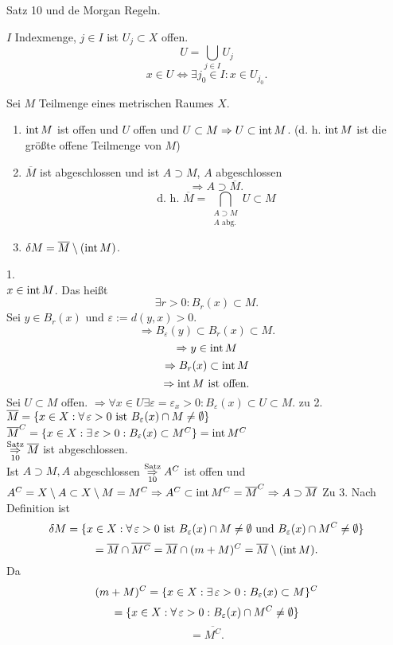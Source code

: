 \documentclass[../ana2.tex]{subfiles}
\begin{document}
\begin{bew}
    Satz 10 und de Morgan Regeln.
\end{bew}
\begin{bem}
    \( I \) Indexmenge, \( j \in I \) ist 
    \( U_j \subset X \) offen.
    \[ U = \bigcup_{j\in I} U_j \]
    \[ x \in U \Leftrightarrow \exists j_0 \in I: 
    x \in U_{j_0}. \]
\end{bem}
\begin{satz}
    Sei \( M \) Teilmenge eines metrischen 
    Raumes \( X \).
    \begin{enumerate}
        \item \( \operatorname{int} M \) ist offen und \( U \) offen 
        und \( U \subset M \Rightarrow U \subset \operatorname{int} M \).
        (d. h. \( \operatorname{int} M \) ist die größte offene Teilmenge 
        von \(M\))
        \item \( \overline{M} \) ist abgeschlossen und ist 
        \(A \supset M \), \( A \) abgeschlossen 
        \[ \Rightarrow A \supset \overline{M}. \]
        \[ \text{d. h. } \overline{M} 
        = \bigcap_{\substack{A \supset M\\A \text{ abg.}}} 
        U \subset M \]
        \item \( \delta M = \overline{M} \setminus (\operatorname{int} M) \).
    \end{enumerate}
\end{satz}
\begin{bew}
    1.\\
    \( x \in \operatorname{int} M \). Das heißt 
    \[ \exists r > 0: B_r(x) \subset M. \]
    Sei \( y \in B_r(x) \) und \( \varepsilon := d(y,x) > 0 \).
    \[ \Rightarrow B_\varepsilon(y) \subset B_r(x) 
    \subset M. \]
    \[ \Rightarrow y \in \operatorname{int} M \]
    \[ \Rightarrow B_r(x) \subset \operatorname{int} M \]
    \[ \Rightarrow \operatorname{int} M \text{ ist offen}. \]
    Sei \( U \subset M \) offen. 
    \( \Rightarrow \forall x \in U 
    \exists \varepsilon = \varepsilon_x > 0: 
    B_\varepsilon(x) \subset U \subset M \).
    zu 2. \( \overline{M} = \set{x \in X: \forall \varepsilon > 0 
    \text{ ist } B_\varepsilon(x) \cap M \neq \emptyset} \) \\
    \( \overline{M}^C = \set{x \in X: \exists \varepsilon > 0: 
    B_\varepsilon(x) \subset M^C} = \inner M^C \) \\
    \( \overset{\text{Satz}}{\underset{\text{10}}{\Rightarrow}} 
    \overline{M} \) ist abgeschlossen.\\
    Ist \(A \supset M, A\) abgeschlossen 
    \( \overset{\text{Satz}}{\underset{\text{10}}{\Rightarrow}}
    A^C \) ist offen und 
    \( A^C = X \setminus A \subset X \setminus M = M^C
    \Rightarrow A^C \subset \operatorname{int} M^C 
    = \overline{M}^C \Rightarrow A \supset \overline{M} \)
    Zu 3. Nach Definition ist 
    \[ \delta M = \set{x \in X : 
    \forall \varepsilon > 0 \text{ ist } 
    B_\varepsilon(x) \cap M \neq \emptyset 
    \text{ und } B_\varepsilon(x) \cap M^C \neq \emptyset} \]
    \[ = \overline{M} \cap \overline{M^C} 
    = \overline{M} \cap (m + M)^C 
    = \overline{M} \setminus (\operatorname{int} M). \]
    Da \[ (m+M)^C = \set{x \in X: \exists \varepsilon > 0: 
    B_\varepsilon(x) \subset M}^C \]
    \[ = \set{ x \in X: \forall \varepsilon > 0: 
    B_\varepsilon(x) \cap M^C \neq \emptyset } \]
    \[ = \overline{M^C}. \]
\end{bew}
\end{document}
